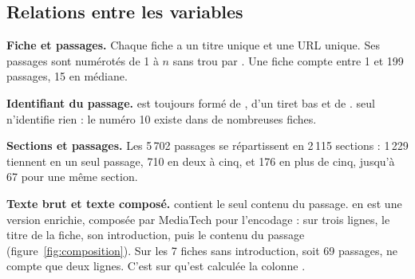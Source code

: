 \subsection{Relations entre les variables}

\textbf{Fiche et passages.} Chaque fiche a un titre unique et une URL unique. Ses passages sont
numérotés de 1 à $n$ sans trou par . Une fiche compte entre 1 et 199 passages, 15 en
médiane.

\textbf{Identifiant du passage.}  est toujours formé de , d'un tiret bas et de
.  seul n'identifie rien : le numéro 10 existe dans de nombreuses
fiches.

\textbf{Sections et passages.} Les 5\,702 passages se répartissent en 2\,115 sections : 1\,229 tiennent
en un seul passage, 710 en deux à cinq, et 176 en plus de cinq, jusqu'à 67 pour une même section.

\textbf{Texte brut et texte composé.}  contient le seul contenu du passage.
 en est une version enrichie, composée par MediaTech pour l'encodage : sur trois lignes,
le titre de la fiche, son introduction, puis le contenu du passage (figure~\ref{fig:composition}). Sur les
7 fiches sans introduction, soit 69 passages,  ne compte que deux lignes. C'est sur
 qu'est calculée la colonne .

